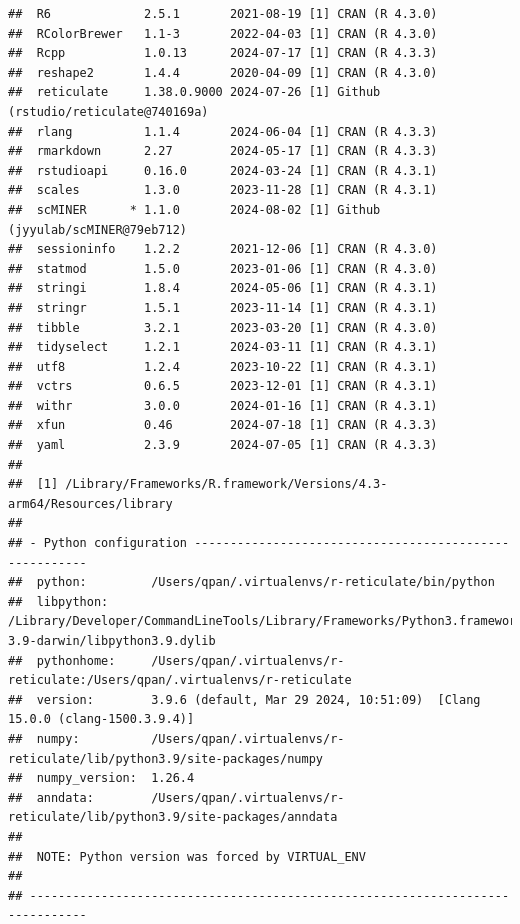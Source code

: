 \documentclass[
  12pt,
]{book}
\begin{document}
\begin{verbatim}
##  R6             2.5.1       2021-08-19 [1] CRAN (R 4.3.0)
##  RColorBrewer   1.1-3       2022-04-03 [1] CRAN (R 4.3.0)
##  Rcpp           1.0.13      2024-07-17 [1] CRAN (R 4.3.3)
##  reshape2       1.4.4       2020-04-09 [1] CRAN (R 4.3.0)
##  reticulate     1.38.0.9000 2024-07-26 [1] Github (rstudio/reticulate@740169a)
##  rlang          1.1.4       2024-06-04 [1] CRAN (R 4.3.3)
##  rmarkdown      2.27        2024-05-17 [1] CRAN (R 4.3.3)
##  rstudioapi     0.16.0      2024-03-24 [1] CRAN (R 4.3.1)
##  scales         1.3.0       2023-11-28 [1] CRAN (R 4.3.1)
##  scMINER      * 1.1.0       2024-08-02 [1] Github (jyyulab/scMINER@79eb712)
##  sessioninfo    1.2.2       2021-12-06 [1] CRAN (R 4.3.0)
##  statmod        1.5.0       2023-01-06 [1] CRAN (R 4.3.0)
##  stringi        1.8.4       2024-05-06 [1] CRAN (R 4.3.1)
##  stringr        1.5.1       2023-11-14 [1] CRAN (R 4.3.1)
##  tibble         3.2.1       2023-03-20 [1] CRAN (R 4.3.0)
##  tidyselect     1.2.1       2024-03-11 [1] CRAN (R 4.3.1)
##  utf8           1.2.4       2023-10-22 [1] CRAN (R 4.3.1)
##  vctrs          0.6.5       2023-12-01 [1] CRAN (R 4.3.1)
##  withr          3.0.0       2024-01-16 [1] CRAN (R 4.3.1)
##  xfun           0.46        2024-07-18 [1] CRAN (R 4.3.3)
##  yaml           2.3.9       2024-07-05 [1] CRAN (R 4.3.3)
## 
##  [1] /Library/Frameworks/R.framework/Versions/4.3-arm64/Resources/library
## 
## - Python configuration -------------------------------------------------------
##  python:         /Users/qpan/.virtualenvs/r-reticulate/bin/python
##  libpython:      /Library/Developer/CommandLineTools/Library/Frameworks/Python3.framework/Versions/3.9/lib/python3.9/config-3.9-darwin/libpython3.9.dylib
##  pythonhome:     /Users/qpan/.virtualenvs/r-reticulate:/Users/qpan/.virtualenvs/r-reticulate
##  version:        3.9.6 (default, Mar 29 2024, 10:51:09)  [Clang 15.0.0 (clang-1500.3.9.4)]
##  numpy:          /Users/qpan/.virtualenvs/r-reticulate/lib/python3.9/site-packages/numpy
##  numpy_version:  1.26.4
##  anndata:        /Users/qpan/.virtualenvs/r-reticulate/lib/python3.9/site-packages/anndata
##  
##  NOTE: Python version was forced by VIRTUAL_ENV
## 
## ------------------------------------------------------------------------------
\end{verbatim}
\end{document}
